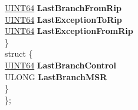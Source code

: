 \begin{DoxyCompactItemize}
\begin{tabbing}
\>\>\hyperlink{_processor_bind_8h_a57be03562867144161c1bfee95ca8f7c}{UINT64} {\bfseries LastBranchFromRip}\\
\>\>\hyperlink{_processor_bind_8h_a57be03562867144161c1bfee95ca8f7c}{UINT64} {\bfseries LastExceptionToRip}\\
\>\>\hyperlink{_processor_bind_8h_a57be03562867144161c1bfee95ca8f7c}{UINT64} {\bfseries LastExceptionFromRip}\\
\>\} \\
\mbox{\label{union___k_t_r_a_p___f_r_a_m_e_1_1_0D1903_a219e85785a88c307bca3249297a031f2}} 
\>struct \{\\
\>\>\hyperlink{_processor_bind_8h_a57be03562867144161c1bfee95ca8f7c}{UINT64} {\bfseries LastBranchControl}\\
\>\>ULONG {\bfseries LastBranchMSR}\\
\>\} \\
\}; \\


\end{tabbing}
\end{DoxyCompactItemize}
